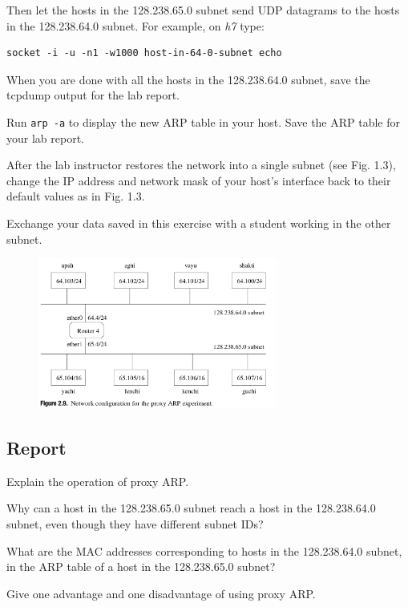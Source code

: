 \documentclass{../UTNetLab}
\begin{document}
    Then let the hosts in the 128.238.65.0 subnet send UDP datagrams to the hosts in the 128.238.64.0 subnet.
    For example, on \textit{h7} type:
    \begin{lstlisting}[emph={host-in-64-0-subnet}]
socket -i -u -n1 -w1000 host-in-64-0-subnet echo
    \end{lstlisting}

    When you are done with all the hosts in the 128.238.64.0 subnet, save the tcpdump output for the lab report.

    Run \lstinline{arp -a} to display the new ARP table in your host.
    Save the ARP table for your lab report.

    After the lab instructor restores the network into a single subnet (see Fig. 1.3), change the IP address and network mask of your host’s interface back to their default values as in Fig. 1.3.

    Exchange your data saved in this exercise with a student working in the other subnet.

    \begin{figure}[H]
        \centering
        \includegraphics[width=0.7\textwidth]{img/figure2-9.png}
    \end{figure}
    
    \subsection*{Report}
    Explain the operation of proxy ARP.

    Why can a host in the 128.238.65.0 subnet reach a host in the 128.238.64.0 subnet, even though they have different subnet IDs?

    What are the MAC addresses corresponding to hosts in the 128.238.64.0 subnet, in the ARP table of a host in the 128.238.65.0 subnet?

    Give one advantage and one disadvantage of using proxy ARP.
\end{document}
